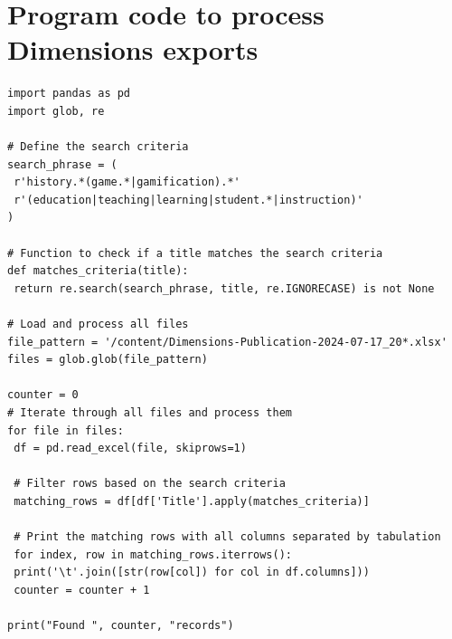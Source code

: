 \documentclass[a4paper,fleqn]{cas-sc}
\begin{document}
%
%
%
%
%


%




\appendix

\section{Program code to process Dimensions exports\label{appA}}

{
\begin{verbatim}
import pandas as pd
import glob, re

# Define the search criteria
search_phrase = (
 r'history.*(game.*|gamification).*'
 r'(education|teaching|learning|student.*|instruction)'
)

# Function to check if a title matches the search criteria
def matches_criteria(title):
 return re.search(search_phrase, title, re.IGNORECASE) is not None

# Load and process all files
file_pattern = '/content/Dimensions-Publication-2024-07-17_20*.xlsx'
files = glob.glob(file_pattern)

counter = 0
# Iterate through all files and process them
for file in files:
 df = pd.read_excel(file, skiprows=1)
 
 # Filter rows based on the search criteria
 matching_rows = df[df['Title'].apply(matches_criteria)]
 
 # Print the matching rows with all columns separated by tabulation
 for index, row in matching_rows.iterrows():
 print('\t'.join([str(row[col]) for col in df.columns]))
 counter = counter + 1
 
print("Found ", counter, "records")
\end{verbatim}
}
\end{document}
